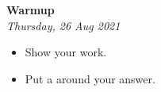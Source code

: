 \documentclass[12pt,letterpaper]{memoir}
\begin{document}
\pagestyle{empty}
\checkandfixthelayout
\raggedbottom

\sffamily
\begin{center}
    {
        \huge
        \bfseries
        Warmup\\
    }
    {
        \Large
        \itshape
        Thursday, 26 Aug 2021
    }
\end{center}

\noindent
\large
\begin{itemize}
    \item Show your work.
    \item Put a  around your answer.
\end{itemize}
\vspace{0.25in}

\end{document}
